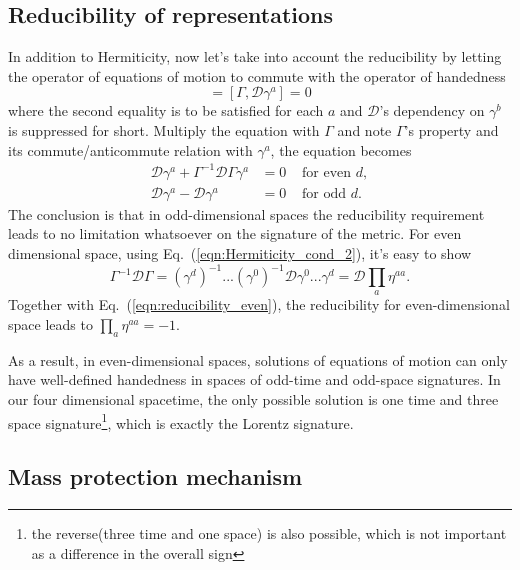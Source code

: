 \documentclass[%
 reprint,
groupedaddress,
showpacs,
 amsmath,amssymb,
 aps,
prb,
]{revtex4-1}
\begin{document}
	


\subsection{Reducibility of representations} %
\label{sub:reducibility_of_representations}


In addition to Hermiticity, now let's take into account the reducibility by letting the operator of equations of motion to commute with the operator of handedness
\begin{equation}
[\Gamma, \mathcal{D}(\gamma^b)\gamma^a p_a ] = [ \Gamma, \mathcal{D}\gamma^a  ] = 0
\end{equation}
where the second equality is to be satisfied for each $a$ and $\mathcal D $'s dependency on $\gamma^b $ is suppressed for short. Multiply the equation with $\Gamma $ and note $\Gamma $'s property and its commute/anticommute relation with $\gamma^a $, the equation becomes
\begin{eqnarray}
	 \mathcal D \gamma^a + \Gamma^{-1} \mathcal D \Gamma \gamma^a &= 0&\text{ for even }d,\label{eqn:reducibility_even} \\
	 \mathcal D \gamma^a - \mathcal D \gamma^a &= 0&\text{ for odd }d.
\end{eqnarray}
The conclusion is that in odd-dimensional spaces the reducibility requirement leads to no
limitation whatsoever on the signature of the metric. For even dimensional space, using Eq.~(\ref{eqn:Hermiticity_cond_2}), it's easy to show
\begin{equation}
\Gamma^{-1} \mathcal D \Gamma = (\gamma^d)^{-1}...(\gamma^0)^{-1} \mathcal  D \gamma^0 ... \gamma^d = \mathcal D \prod_a \eta^{aa}.
\end{equation}
Together with Eq.~(\ref{eqn:reducibility_even}), the reducibility for even-dimensional space leads to $ \prod_a \eta^{aa}=-1 $.

As a result, in even-dimensional spaces, solutions of equations of motion
can only have well-defined handedness in spaces of odd-time and odd-space signatures. In our four dimensional spacetime, the only possible solution is one time and three space signature\footnote{the reverse(three time and one space) is also possible, which is not important as a difference in the overall sign}, which is exactly the Lorentz signature.



\subsection{Mass protection mechanism} %
\label{sub:mass_protection_mechanism}
\end{document}
